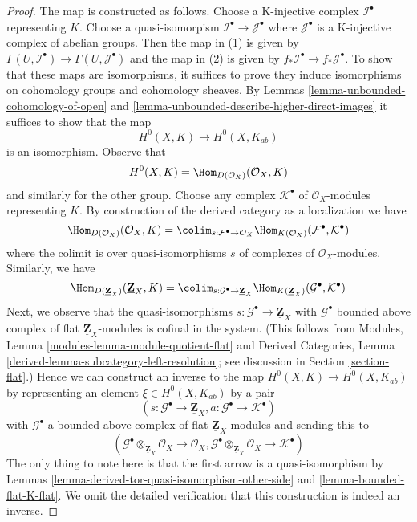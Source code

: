 \begin{proof}
The map is constructed as follows. Choose a K-injective complex
$\mathcal{I}^\bullet$ representing $K$. Choose a quasi-isomorpism
$\mathcal{I}^\bullet \to \mathcal{J}^\bullet$ where $\mathcal{J}^\bullet$
is a K-injective complex of abelian groups. Then the map in (1)
is given by $\Gamma(U, \mathcal{I}^\bullet) \to \Gamma(U, \mathcal{J}^\bullet)$
and the map in (2) is given by
$f_*\mathcal{I}^\bullet \to f_*\mathcal{J}^\bullet$.
To show that these maps are isomorphisms, it suffices to prove
they induce isomorphisms on cohomology groups and cohomology sheaves.
By Lemmas \ref{lemma-unbounded-cohomology-of-open} and
\ref{lemma-unbounded-describe-higher-direct-images}
it suffices to show that the map
$$
H^0(X, K) \longrightarrow H^0(X, K_{ab})
$$
is an isomorphism. Observe that
$$
H^0(X, K) = \Hom_{D(\mathcal{O}_X)}(\mathcal{O}_X, K)
$$
and similarly for the other group. Choose any complex $\mathcal{K}^\bullet$
of $\mathcal{O}_X$-modules representing $K$. By construction of the
derived category as a localization we have
$$
\Hom_{D(\mathcal{O}_X)}(\mathcal{O}_X, K) =
\colim_{s : \mathcal{F}^\bullet \to \mathcal{O}_X}
\Hom_{K(\mathcal{O}_X)}(\mathcal{F}^\bullet, \mathcal{K}^\bullet)
$$
where the colimit is over quasi-isomorphisms $s$ of complexes of
$\mathcal{O}_X$-modules. Similarly, we have
$$
\Hom_{D(\underline{\mathbf{Z}}_X)}(\underline{\mathbf{Z}}_X, K) =
\colim_{s : \mathcal{G}^\bullet \to \underline{\mathbf{Z}}_X}
\Hom_{K(\underline{\mathbf{Z}}_X)}(\mathcal{G}^\bullet, \mathcal{K}^\bullet)
$$
Next, we observe that the quasi-isomorphisms
$s : \mathcal{G}^\bullet \to \underline{\mathbf{Z}}_X$
with $\mathcal{G}^\bullet$ bounded above complex of flat
$\underline{\mathbf{Z}}_X$-modules is cofinal in the system.
(This follows from Modules, Lemma \ref{modules-lemma-module-quotient-flat} and
Derived Categories, Lemma \ref{derived-lemma-subcategory-left-resolution};
see discussion in Section \ref{section-flat}.)
Hence we can construct an inverse to the map
$H^0(X, K) \longrightarrow H^0(X, K_{ab})$
by representing an element $\xi \in H^0(X, K_{ab})$ by a pair
$$
(s : \mathcal{G}^\bullet \to \underline{\mathbf{Z}}_X,
a : \mathcal{G}^\bullet \to \mathcal{K}^\bullet)
$$
with $\mathcal{G}^\bullet$ a bounded above complex of flat
$\underline{\mathbf{Z}}_X$-modules and sending this to
$$
(\mathcal{G}^\bullet \otimes_{\underline{\mathbf{Z}}_X} \mathcal{O}_X
\to \mathcal{O}_X,
\mathcal{G}^\bullet  \otimes_{\underline{\mathbf{Z}}_X} \mathcal{O}_X
\to \mathcal{K}^\bullet)
$$
The only thing to note here is that the first arrow
is a quasi-isomorphism by
Lemmas \ref{lemma-derived-tor-quasi-isomorphism-other-side} and
\ref{lemma-bounded-flat-K-flat}.
We omit the detailed verification that this construction
is indeed an inverse.
\end{proof}

